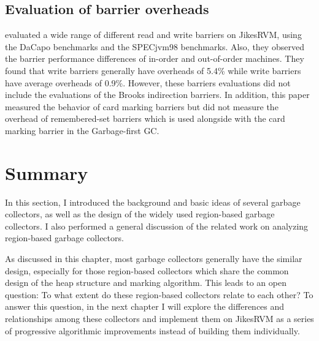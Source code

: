 \subsection{Evaluation of barrier overheads}

\cite{yang2012barriers} evaluated a wide range of different read and write barriers
on JikesRVM, using the DaCapo benchmarks and the SPECjvm98 benchmarks.
Also, they observed the barrier performance differences of in-order and out-of-order machines.
They found that write barriers generally have overheads of 5.4\% while write
barriers have average overheads of 0.9\%. However, these barriers evaluations did not
include the evaluations of the Brooks indirection barriers. In addition, this paper
measured the behavior of card marking barriers but did not measure the overhead of
remembered-set barriers which is used alongside with the card marking barrier in
the Garbage-first GC.

\section{Summary}

In this section, I introduced the background and basic ideas of several garbage collectors,
as well as the design of the widely used region-based garbage collectors.
I also performed a general discussion of the related work on analyzing region-based garbage collectors.

As discussed in this chapter, most garbage collectors generally have the similar design, especially for those
region-based collectors which share the common design of the heap structure and
marking algorithm.
This leads to an open question: To what extent do these region-based collectors
relate to each other? To answer this question, in the next chapter I will explore the
differences and relationships among these collectors and implement them on JikesRVM
as a series of progressive algorithmic improvements instead of building them individually.
